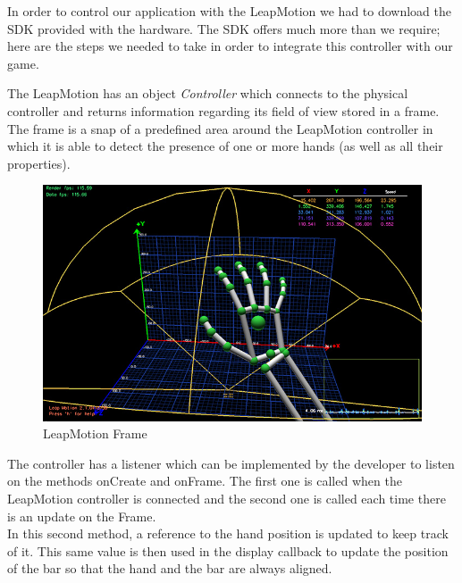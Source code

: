 \documentclass[a4paper]{report}
\begin{document}
In order to control our application with the LeapMotion we had to download the SDK provided with the hardware. The SDK offers much more than we require; here are the steps we needed to take in order to integrate this controller with our game.

The LeapMotion has an object \emph{Controller} which connects to the physical controller and returns information regarding its field of view stored in a frame. The frame is a snap of a predefined area around the LeapMotion controller in which it is able to detect the presence of one or more hands (as well as all their properties).
\begin{figure}[H]
\centering
\includegraphics[scale=0.5]{Frame}
\caption{LeapMotion Frame}
\end{figure}
The controller has a listener which can be implemented by the developer to listen on the methods onCreate and onFrame. The first one is called when the LeapMotion controller is connected and the second one is called each time there is an update on the Frame. \\
In this second method, a reference to the hand position is updated to keep track of it. This same value is then used in the display callback to update the position of the bar so that the hand and the bar are always aligned.\\
\end{document}
